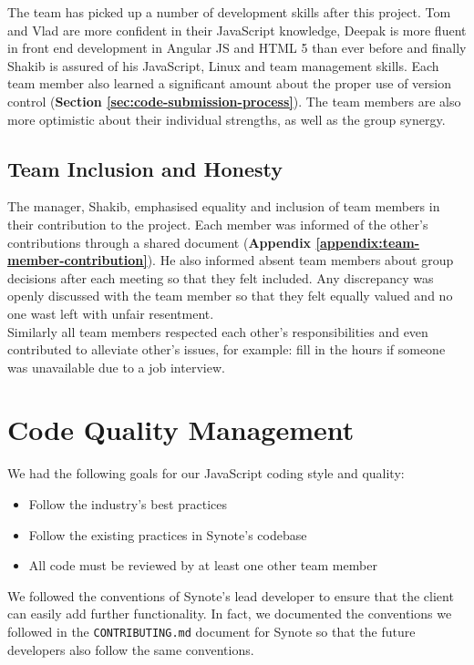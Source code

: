 The team has picked up a number of development skills after this project. Tom and Vlad are more confident in their JavaScript knowledge, Deepak is more fluent in front end development in Angular JS and HTML 5 than ever before and finally Shakib is assured of his JavaScript, Linux and team management skills. Each team member also learned a significant amount about the proper use of version control (\textbf{Section \ref{sec:code-submission-process}}). The team members are also more optimistic about their individual strengths, as well as the group synergy.

\subsection{Team Inclusion and Honesty}
\label{subsec:team-inclusion}
The manager, Shakib, emphasised equality and inclusion of team members in their contribution to the project. Each member was informed of the other's contributions through a shared document (\textbf{Appendix \ref{appendix:team-member-contribution}}). He also informed absent team members about group decisions after each meeting so that they felt included. Any discrepancy was openly discussed with the team member so that they felt equally valued and no one wast left with unfair resentment.\\

Similarly all team members respected each other's responsibilities and even contributed to alleviate other's issues, for example: fill in the hours if someone was unavailable due to a job interview.

\section{Code Quality Management}
\label{sec:code-quality-management}

We had the following goals for our JavaScript coding style and quality:

\begin{itemize}

  \item Follow the industry's best practices
  \item Follow the existing practices in Synote's codebase
  \item All code must be reviewed by at least one other team member

\end{itemize}

We followed the conventions of Synote's lead developer to ensure that the client can easily add further functionality. In fact, we documented the conventions we followed in the \texttt{CONTRIBUTING.md} document for Synote so that the future developers also follow the same conventions.\\

